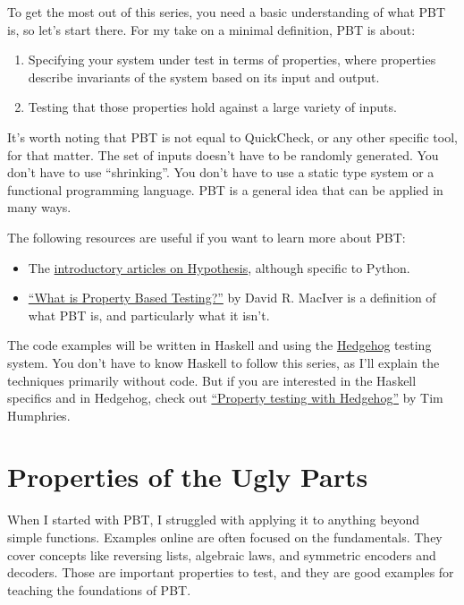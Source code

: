 To get the most out of this series, you need a basic understanding of what PBT is, so let's start there. For my take on a minimal definition, PBT is about:

\begin{enumerate}
\item Specifying your system under test in terms of properties, where properties describe invariants of the system based on its input and output.
\item Testing that those properties hold against a large variety of inputs.
\end{enumerate}
It's worth noting that PBT is not equal to QuickCheck, or any other specific tool, for that matter. The set of inputs doesn't have to be randomly generated. You don't have to use ``shrinking''. You don't have to use a static type system or a functional programming language. PBT is a general idea that can be applied in many ways.

The following resources are useful if you want to learn more about PBT:

\begin{itemize}
\item The \href{https://hypothesis.works/articles/intro/}{introductory articles on Hypothesis}, although specific to Python.
\item \href{https://hypothesis.works/articles/what-is-property-based-testing/}{``What is Property Based Testing?''} by David R. MacIver is a definition of what PBT is, and particularly what it isn't.
\end{itemize}
The code examples will be written in Haskell and using the \href{https://hackage.haskell.org/package/hedgehog}{Hedgehog} testing system. You don't have to know Haskell to follow this series, as I'll explain the techniques primarily without code. But if you are interested in the Haskell specifics and in Hedgehog, check out \href{https://teh.id.au/posts/2017/04/23/property-testing-with-hedgehog/}{``Property testing with Hedgehog''} by Tim Humphries.

\section{Properties of the Ugly Parts}


When I started with PBT, I struggled with applying it to anything beyond simple functions. Examples online are often focused on the fundamentals. They cover concepts like reversing lists, algebraic laws, and symmetric encoders and decoders. Those are important properties to test, and they are good examples for teaching the foundations of PBT.

